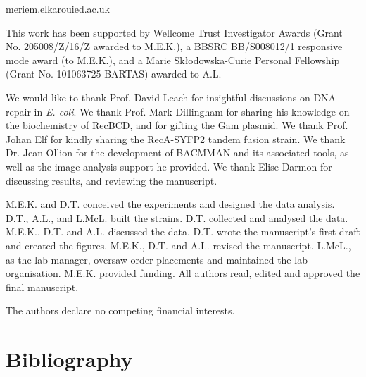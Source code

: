 \documentclass[times, twoside]{zHenriquesLab-StyleBioRxiv}
\begin{document}
\begin{corrauthor}
    meriem.elkaroui\at ed.ac.uk
\end{corrauthor}









\begin{funding}
    This work has been supported by Wellcome Trust Investigator Awards (Grant No. 205008/Z/16/Z awarded to M.E.K.), a BBSRC BB/S008012/1 responsive mode award (to M.E.K.), and a Marie Skłodowska-Curie Personal Fellowship (Grant No. 101063725-BARTAS) awarded to A.L.
\end{funding}

\begin{acknowledgements}
    We would like to thank Prof. David Leach for insightful discussions on DNA repair in \emph{E. coli}. We thank Prof. Mark Dillingham for sharing his knowledge on the biochemistry of RecBCD, and for gifting the Gam plasmid. We thank Prof. Johan Elf for kindly sharing the RecA-SYFP2 tandem fusion strain. We thank Dr. Jean Ollion for the development of BACMMAN and its associated tools, as well as the image analysis support he provided. We thank Elise Darmon for discussing results, and reviewing the manuscript.
\end{acknowledgements}

\begin{contributions}
    M.E.K. and D.T. conceived the experiments and designed the data analysis. D.T., A.L., and L.McL. built the strains. D.T. collected and analysed the data. M.E.K., D.T. and A.L. discussed the data. D.T. wrote the manuscript's first draft and created the figures. M.E.K., D.T. and A.L. revised the manuscript. L.McL., as the lab manager, oversaw order placements and maintained the lab organisation. M.E.K. provided funding. All authors read, edited and approved the final manuscript.
\end{contributions}

\begin{interests}
    The authors declare no competing financial interests.
\end{interests}

\section*{Bibliography}

\end{document}

